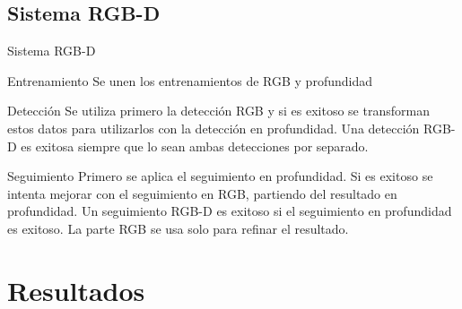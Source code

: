 \documentclass[]{beamer}
\begin{document}
\subsection{Sistema RGB-D}
\begin{frame}[t]{Sistema RGB-D}
    \begin{block}{Entrenamiento}
        Se unen los entrenamientos de RGB y profundidad
    \end{block}
    \begin{block}{Detección}
        Se utiliza primero la detección RGB y si es exitoso se transforman estos datos para utilizarlos con la detección en profundidad. Una detección RGB-D es exitosa siempre que lo sean ambas detecciones por separado.
    \end{block}
    \begin{block}{Seguimiento}
        Primero se aplica el seguimiento en profundidad. Si es exitoso se intenta mejorar con el seguimiento en RGB, partiendo del resultado en profundidad. Un seguimiento RGB-D es exitoso si el seguimiento en profundidad es exitoso. La parte RGB se usa solo para refinar el resultado.
    \end{block}
\end{frame}


\section{Resultados}
\end{document}
